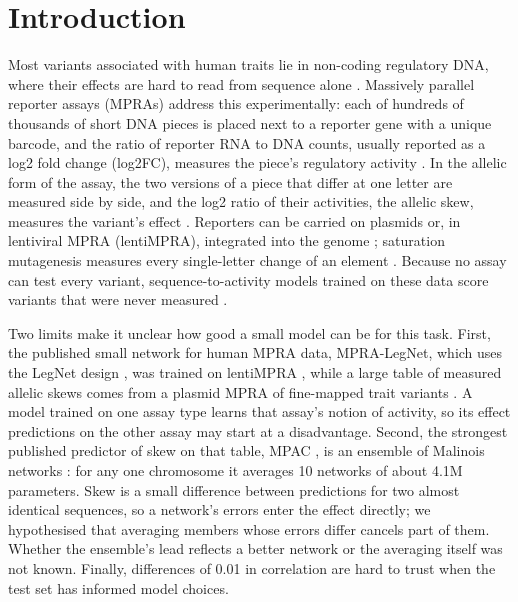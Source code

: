 \documentclass[11pt]{article}
\begin{document}
\section{Introduction}
Most variants associated with human traits lie in non-coding regulatory DNA, where their effects are hard to read from sequence alone \cite{siraj2026functional}. Massively parallel reporter assays (MPRAs) address this experimentally: each of hundreds of thousands of short DNA pieces is placed next to a reporter gene with a unique barcode, and the ratio of reporter RNA to DNA counts, usually reported as a log2 fold change (log2FC), measures the piece's regulatory activity \cite{melnikov2012systematic,patwardhan2012massively,inoue2015decoding}. In the allelic form of the assay, the two versions of a piece that differ at one letter are measured side by side, and the log2 ratio of their activities, the allelic skew, measures the variant's effect \cite{tewhey2016direct,ulirsch2016systematic,siraj2026functional}. Reporters can be carried on plasmids or, in lentiviral MPRA (lentiMPRA), integrated into the genome \cite{gordon2020lentimpra,agarwal2025massively}; saturation mutagenesis measures every single-letter change of an element \cite{kircher2019saturation}. Because no assay can test every variant, sequence-to-activity models trained on these data score variants that were never measured \cite{eraslan2019deep,zhou2015predicting,kelley2016basset}.

Two limits make it unclear how good a small model can be for this task. First, the published small network for human MPRA data, MPRA-LegNet, which uses the LegNet design \cite{penzar2023legnet}, was trained on lentiMPRA \cite{agarwal2025massively}, while a large table of measured allelic skews comes from a plasmid MPRA of fine-mapped trait variants \cite{siraj2026functional}. A model trained on one assay type learns that assay's notion of activity, so its effect predictions on the other assay may start at a disadvantage. Second, the strongest published predictor of skew on that table, MPAC \cite{butts2025identifying}, is an ensemble of Malinois networks \cite{gosai2024machineguided}: for any one chromosome it averages 10 networks of about 4.1M parameters. Skew is a small difference between predictions for two almost identical sequences, so a network's errors enter the effect directly; we hypothesised that averaging members whose errors differ cancels part of them. Whether the ensemble's lead reflects a better network or the averaging itself was not known. Finally, differences of 0.01 in correlation are hard to trust when the test set has informed model choices.
\end{document}
